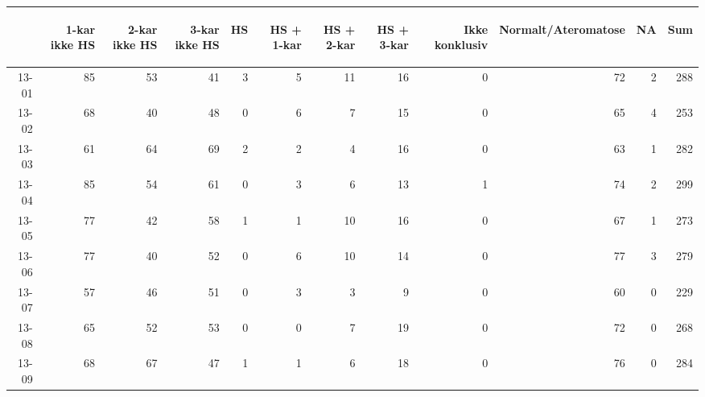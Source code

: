 \documentclass[presentation,xcolor=pdftex,dvipsnames,table]{beamer}
\begin{document}
\begin{frame}
\begin{tiny}
\begin{table}[ht]
\centering
\begin{tabular}{rrrrrrrrrrrr}
  \toprule
 & \begin{sideways} 1-kar ikke HS \end{sideways} & \begin{sideways} 2-kar ikke HS \end{sideways} & \begin{sideways} 3-kar ikke HS \end{sideways} & \begin{sideways} HS \end{sideways} & \begin{sideways} HS + 1-kar \end{sideways} & \begin{sideways} HS + 2-kar \end{sideways} & \begin{sideways} HS + 3-kar \end{sideways} & \begin{sideways} Ikke konklusiv \end{sideways} & \begin{sideways} Normalt/Ateromatose \end{sideways} & \begin{sideways} NA \end{sideways} & \begin{sideways} Sum \end{sideways} \\ 
  \midrule
13-01 & 85 & 53 & 41 & 3 & 5 & 11 & 16 & 0 & 72 & 2 & 288 \\ 
  13-02 & 68 & 40 & 48 & 0 & 6 & 7 & 15 & 0 & 65 & 4 & 253 \\ 
  13-03 & 61 & 64 & 69 & 2 & 2 & 4 & 16 & 0 & 63 & 1 & 282 \\ 
  13-04 & 85 & 54 & 61 & 0 & 3 & 6 & 13 & 1 & 74 & 2 & 299 \\ 
  13-05 & 77 & 42 & 58 & 1 & 1 & 10 & 16 & 0 & 67 & 1 & 273 \\ 
  13-06 & 77 & 40 & 52 & 0 & 6 & 10 & 14 & 0 & 77 & 3 & 279 \\ 
  13-07 & 57 & 46 & 51 & 0 & 3 & 3 & 9 & 0 & 60 & 0 & 229 \\ 
  13-08 & 65 & 52 & 53 & 0 & 0 & 7 & 19 & 0 & 72 & 0 & 268 \\ 
  13-09 & 68 & 67 & 47 & 1 & 1 & 6 & 18 & 0 & 76 & 0 & 284 \\ 

\end{tabular}
\end{table}
\end{tiny}
\end{frame}
\end{document}
